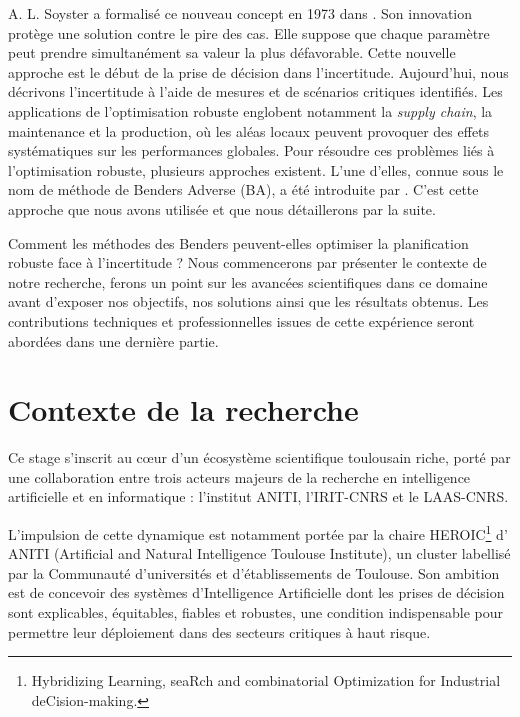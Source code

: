 \documentclass[12pt, a4paper, twoside]{article}
\numberwithin{equation}{section}
\begin{document}
    A. L. Soyster a formalisé ce nouveau concept en 1973 dans \cite{soyster1973convex}. Son innovation protège une solution contre le pire des cas. Elle suppose que chaque paramètre peut prendre simultanément sa valeur la plus défavorable. Cette nouvelle approche est le début de la prise de décision dans l'incertitude. Aujourd'hui, nous décrivons l'incertitude à l'aide de mesures et de scénarios critiques identifiés. Les applications de l'optimisation robuste englobent notamment la \textit{supply chain}, la maintenance et la production, où les aléas locaux peuvent provoquer des effets systématiques sur les performances globales. Pour résoudre ces problèmes liés à l'optimisation robuste, plusieurs approches existent. L'une d'elles, connue sous le nom de méthode de Benders Adverse (BA), a été introduite par \cite{Mutapcic01062009}. C'est cette approche que nous avons utilisée et que nous détaillerons par la suite.

    Comment les méthodes des Benders peuvent-elles optimiser la planification robuste face à l'incertitude ? Nous commencerons par présenter le contexte de notre recherche, ferons un point sur les avancées scientifiques dans ce domaine avant d'exposer nos objectifs, nos solutions ainsi que les résultats obtenus. Les contributions techniques et professionnelles issues de cette expérience seront abordées dans une dernière partie.
    
	\clearpage
	\section{Contexte de la recherche}
	
	Ce stage s'inscrit au cœur d'un écosystème scientifique toulousain riche, porté par une collaboration entre trois acteurs majeurs de la recherche en intelligence artificielle et en informatique : l'institut ANITI, l'IRIT-CNRS et le LAAS-CNRS.
	
	L'impulsion de cette dynamique est notamment portée par la chaire HEROIC\footnote{Hybridizing Learning, seaRch and combinatorial Optimization for Industrial deCision-making.} d' ANITI (Artificial and Natural Intelligence Toulouse Institute), un cluster labellisé par la Communauté d'universités et d'établissements de Toulouse. Son ambition est de concevoir des systèmes d'Intelligence Artificielle dont les prises de décision sont explicables, équitables, fiables et robustes, une condition indispensable pour permettre leur déploiement dans des secteurs critiques à haut risque.
	
\end{document}
